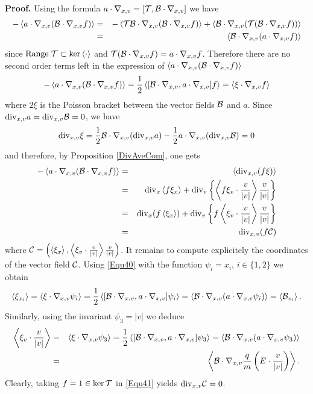 \documentclass[12pt, a4paper]{article}
\newcounter{steps}
\newenvironment{proof}[1][]{%
\par\medbreak\setcounter{steps}{0}
{\noindent\bfseries Proof#1. }} {\hfill\fbox{\ }\medbreak}
\newcommand{\Divx}[0]{
\mathrm{div}_x}
\newcommand{\Divv}[0]{
\mathrm{div}_v}
\newcommand{\Divxv}[0]{
\mathrm{div}_{x,v}}
\newcommand{\ran}[0]{
\mathrm{Range\;}}
\newcommand{\nxv}[0]{
\nabla_{x,v}}
\newcommand{\ave}[1]{
\left \langle #1 \right \rangle }
\begin{document}
\begin{proof}
Using the formula $a \cdot \nxv = [{\cal T}, {\cal B} \cdot \nxv ]$ we have
\begin{eqnarray}
\label{Equ40} - \ave{a \cdot \nxv ( {\cal B} \cdot \nxv f )} & = & - \ave{{\cal T} {\cal B} \cdot \nxv ( {\cal B} \cdot \nxv f)} + \ave{{\cal B} \cdot \nxv ( {\cal T} ( {\cal B} \cdot \nxv f ))} \nonumber \\
& = & \ave{{\cal B} \cdot \nxv ( a \cdot  \nxv f) } 
\end{eqnarray}
since $\ran {\cal T} \subset \ker \ave{\cdot}$ and ${\cal T} ( {\cal B} \cdot \nxv f ) = a \cdot \nxv f$. Therefore there are no second order terms left in the expression of $\ave{a \cdot \nxv ( {\cal B} \cdot \nxv f)}$
\[
- \ave{a \cdot \nxv ( {\cal B} \cdot \nxv f)} = \frac{1}{2}\ave{[{\cal B} \cdot \nxv, a \cdot \nxv ]f} = \ave{\xi \cdot \nxv f}
\]
where $2\xi$ is the Poisson bracket between the vector fields $ {\cal B}$ and $a$. Since $\Divxv a = \Divxv {\cal B} = 0$, we have
\[
\Divxv \xi = \frac{1}{2}{\cal B} \cdot \nxv (\Divxv a) - \frac{1}{2} a \cdot \nxv ( \Divxv {\cal B}) = 0
\]
and therefore, by Proposition \ref{DivAveCom}, one gets
\begin{eqnarray}
\label{Equ41} - \ave{a \cdot \nxv ( {\cal B} \cdot \nxv f)} & = & \ave{\Divxv (f \xi)} \nonumber \\
& = & \Divx \ave{f \xi _x} + \Divv \left \{ \ave{f \xi _v \cdot \frac{v}{|v|}} \frac{v}{|v|}  \right \} \nonumber \\
& = & \Divx (f\ave{ \xi _x}) + \Divv \left \{ f \ave{ \xi _v \cdot \frac{v}{|v|}} \frac{v}{|v|}  \right \} \nonumber \\
& = & \Divxv (f {\cal C})
\end{eqnarray}
where ${\cal C} = \left ( \ave{\xi _x}, \ave{ \xi _v \cdot \frac{v}{|v|}} \frac{v}{|v|}\right )$. It remains to compute explicitely the coordinates of the vector field ${\cal C}$. Using \eqref{Equ40} with the function $\psi _i = x_i$, $i \in \{1,2\}$ we obtain
\[
\ave{\xi _{x_i}} = \ave{\xi \cdot \nxv \psi _i } = \frac{1}{2} \ave{[{\cal B} \cdot \nxv, a \cdot \nxv ] \psi _i }  = \ave{{\cal B} \cdot \nxv ( a \cdot \nxv \psi _i )} = \ave{{\cal B}_{v_i}}.
\]
Similarly, using the invariant $\psi _3 = |v|$ we deduce 
\begin{eqnarray}
\ave{\xi _v \cdot \frac{v}{|v|}} & = & \ave{\xi \cdot \nxv \psi _3 } = \frac{1}{2} \ave{[{\cal B} \cdot \nxv, a \cdot \nxv ] \psi _3 }  = \ave{{\cal B} \cdot \nxv ( a \cdot \nxv \psi _3 )} \nonumber \\
& = & \ave{{\cal B} \cdot \nxv \frac{q}{m} \left ( E \cdot \frac{v}{|v|} \right ) }\nonumber.
\end{eqnarray}
Clearly, taking $f = 1 \in \ker {\cal T}$ in \eqref{Equ41} yields $\Divxv {\cal C} = 0$.
\end{proof}
\end{document}
